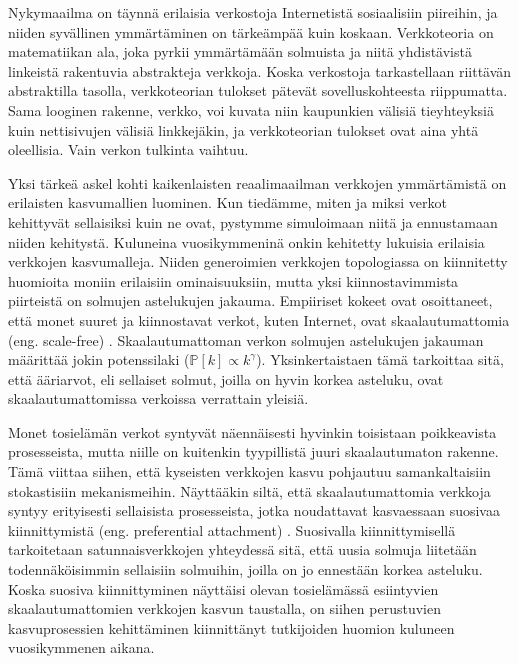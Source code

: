 \documentclass[finnish, 12pt, a4paper, sci, utf8, pdfa]{aaltothesis}
\newcommand*{\prob}{\mathbb{P}}
\begin{document}
Nykymaailma on täynnä erilaisia verkostoja Internetistä sosiaalisiin piireihin, ja niiden syvällinen ymmärtäminen on tärkeämpää kuin koskaan. Verkkoteoria on matematiikan ala, 
joka pyrkii ymmärtämään solmuista ja niitä yhdistävistä linkeistä rakentuvia abstrakteja verkkoja. Koska verkostoja tarkastellaan riittävän abstraktilla tasolla, verkkoteorian 
tulokset pätevät sovelluskohteesta riippumatta. Sama looginen rakenne, verkko, voi kuvata niin kaupunkien välisiä tieyhteyksiä kuin nettisivujen 
välisiä linkkejäkin, ja verkkoteorian tulokset ovat aina yhtä oleellisia. Vain verkon tulkinta vaihtuu. 

Yksi tärkeä askel kohti kaikenlaisten reaalimaailman verkkojen ymmärtämistä on erilaisten kasvumallien luominen. Kun tiedämme, miten ja miksi verkot kehittyvät sellaisiksi kuin ne ovat,
pystymme simuloimaan niitä ja ennustamaan niiden kehitystä. Kuluneina vuosikymmeninä onkin kehitetty lukuisia erilaisia verkkojen kasvumalleja. Niiden generoimien verkkojen
topologiassa on kiinnitetty huomioita moniin erilaisiin ominaisuuksiin, mutta yksi kiinnostavimmista piirteistä on solmujen astelukujen jakauma. Empiiriset kokeet ovat osoittaneet, 
että monet suuret ja kiinnostavat verkot, kuten Internet, ovat skaalautumattomia (eng. scale-free) \cite{Clauset}. Skaalautumattoman verkon solmujen astelukujen jakauman määrittää jokin 
potenssilaki ($ \prob \left[ k \right] \propto k^{\gamma} $). Yksinkertaistaen tämä tarkoittaa sitä, että ääriarvot, eli sellaiset solmut, joilla on hyvin korkea asteluku, ovat 
skaalautumattomissa verkoissa verrattain yleisiä. \cite{Babarasi-kirja} 

Monet tosielämän verkot syntyvät näennäisesti hyvinkin toisistaan poikkeavista prosesseista, mutta niille on kuitenkin tyypillistä juuri skaalautumaton rakenne. Tämä viittaa siihen,
että kyseisten verkkojen kasvu pohjautuu samankaltaisiin stokastisiin mekanismeihin. Näyttääkin siltä, että skaalautumattomia verkkoja syntyy erityisesti sellaisista prosesseista, 
jotka noudattavat kasvaessaan suosivaa kiinnittymistä (eng. preferential attachment) \cite{Babarasi}. Suosivalla kiinnittymisellä tarkoitetaan satunnaisverkkojen yhteydessä sitä, että uusia 
solmuja liitetään todennäköisimmin sellaisiin solmuihin, joilla on jo ennestään korkea asteluku. Koska suosiva kiinnittyminen näyttäisi olevan tosielämässä esiintyvien skaalautumattomien
verkkojen kasvun taustalla, on siihen perustuvien kasvuprosessien kehittäminen kiinnittänyt tutkijoiden huomion kuluneen vuosikymmenen aikana. 
\end{document}
